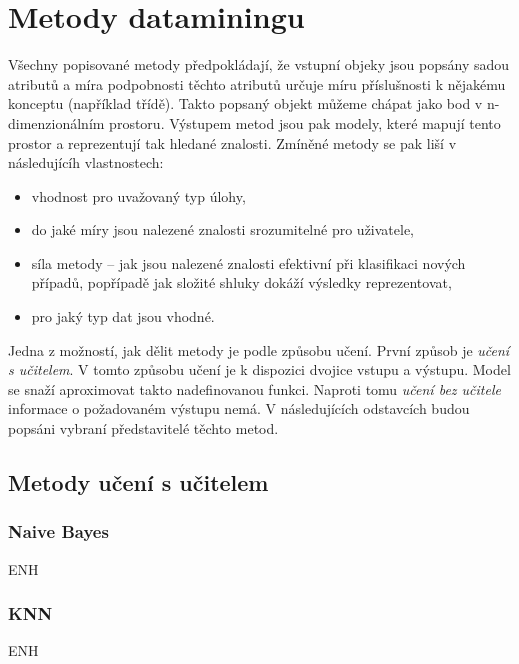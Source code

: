 \documentclass[thesis=M,czech]{FITthesis}[2012/06/26]
\begin{document}
 \section{Metody dataminingu}
Všechny popisované metody předpokládají, že vstupní objeky jsou popsány sadou atributů a míra podpobnosti těchto atributů určuje míru příslušnosti k nějakému konceptu (například třídě). Takto popsaný objekt můžeme chápat jako bod v n-dimenzionálním prostoru. Výstupem metod jsou pak modely, které mapují tento prostor a reprezentují tak hledané znalosti.
Zmíněné metody se pak liší v následujícíh vlastnostech:


\begin{itemize}
\item vhodnost pro uvažovaný typ úlohy,
\item do jaké míry jsou nalezené znalosti srozumitelné pro uživatele,
\item síla metody -- jak jsou nalezené znalosti efektivní při klasifikaci nových případů, popřípadě jak složité shluky dokáží výsledky reprezentovat,
\item pro jaký typ dat jsou vhodné.
\end{itemize}


Jedna z možností, jak dělit metody je podle způsobu učení. První způsob je \textit{učení s učitelem}. V tomto způsobu učení je k dispozici dvojice vstupu a výstupu. Model se snaží aproximovat takto nadefinovanou funkci. Naproti tomu \textit{učení bez učitele} informace o požadovaném výstupu nemá. V následujících odstavcích budou popsáni vybraní představitelé těchto metod.\cite{eurokomise}

 \subsection{Metody učení s učitelem}
 \subsubsection*{Naive Bayes}
 ENH
 \subsubsection*{KNN}
 ENH
\end{document}
